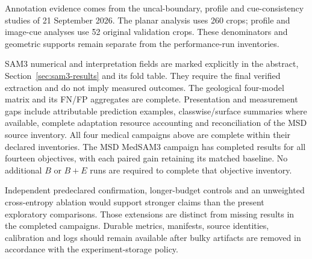 \documentclass[12pt,a4paper]{article}
\begin{document}
Annotation evidence comes from the uncal-boundary, profile and
cue-consistency studies of 21 September 2026.
The planar analysis uses 260 crops; profile and image-cue analyses use 52 original
validation crops. These denominators and geometric supports remain
separate from the performance-run inventories.

SAM3 numerical and interpretation fields are marked explicitly in the
abstract, Section~\ref{sec:sam3-results} and its fold table. They require
the final verified extraction and do not imply measured outcomes.
The geological four-model matrix and its FN/FP aggregates are complete. Presentation
and measurement gaps include attributable prediction examples,
classwise/surface summaries where available, complete adaptation
resource accounting and reconciliation of the MSD source inventory.
All four medical campaigns above are complete within their declared
inventories. The MSD MedSAM3 campaign has completed results for all
fourteen objectives, with each paired gain retaining its matched baseline. No additional $B$ or $B+E$ runs are required to
complete that objective inventory.

Independent predeclared confirmation, longer-budget controls and
an unweighted cross-entropy ablation would support stronger claims
than the present exploratory comparisons. Those extensions are distinct
from missing results in the completed campaigns. Durable metrics,
manifests, source identities, calibration and logs should remain
available after bulky artifacts are removed in accordance with the
experiment-storage policy.

\clearpage
\end{document}
